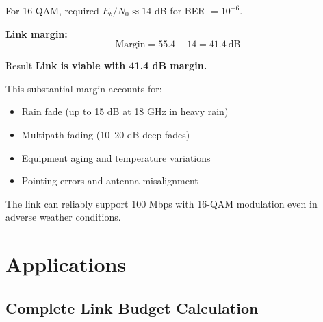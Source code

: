 For 16-QAM, required $E_b/N_0 \approx 14$ dB for BER $= 10^{-6}$.

\textbf{Link margin:}
\begin{equation}
\text{Margin} = 55.4 - 14 = 41.4\ \text{dB}
\end{equation}

\begin{calloutbox}[colback=green!10,colframe=green!50!black]{Result}
\textbf{Link is viable with 41.4 dB margin.}

This substantial margin accounts for:
\begin{itemize}
\item Rain fade (up to 15 dB at 18 GHz in heavy rain)
\item Multipath fading (10--20 dB deep fades)
\item Equipment aging and temperature variations
\item Pointing errors and antenna misalignment
\end{itemize}

The link can reliably support 100 Mbps with 16-QAM modulation even in adverse weather conditions.
\end{calloutbox}

\section{Applications}
\label{sec:applications}

\subsection{Complete Link Budget Calculation}
\label{subsec:link-budget-example}

